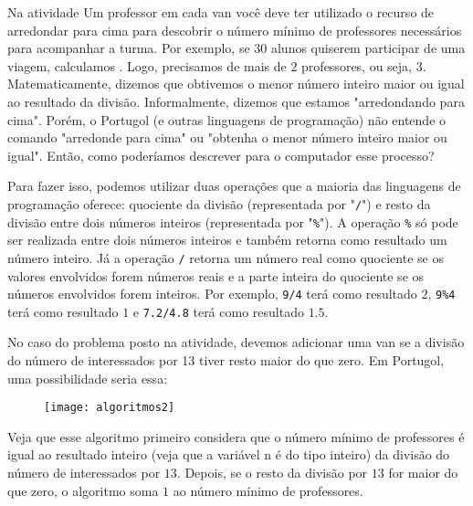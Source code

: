 Na atividade Um professor em cada van você deve ter utilizado o recurso de arredondar para cima para descobrir o número mínimo de professores necessários para acompanhar a turma. Por exemplo, se $30$ alunos quiserem participar de uma viagem, calculamos . Logo, precisamos de mais de $2$ professores, ou seja, $3$. Matematicamente, dizemos que obtivemos o menor número inteiro maior ou igual ao resultado da divisão. Informalmente, dizemos que estamos "arredondando para cima". Porém, o Portugol (e outras linguagens de programação) não entende o comando "arredonde para cima"{} ou "obtenha o menor número inteiro maior ou igual". Então, como poderíamos descrever para o computador esse processo?

Para fazer isso, podemos utilizar duas operações que a maioria das linguagens de programação oferece: quociente da divisão (representada por "\verb|/|") e resto da divisão entre dois números inteiros (representada por "\verb|%|"). A operação \verb|%| só pode ser realizada entre dois números inteiros e também retorna como resultado um número inteiro. Já a operação \verb|/| retorna um número real como quociente se os valores envolvidos forem números reais e a parte inteira do quociente se os números envolvidos forem inteiros. Por exemplo, \verb|9/4| terá como resultado $2$, \verb|9%4| terá como resultado $1$ e \verb|7.2/4.8| terá como resultado $1.5$.

No caso do problema posto na atividade, devemos adicionar uma van se a divisão do número de interessados por 13 tiver resto maior do que zero. Em Portugol, uma possibilidade seria essa:

\begin{figure}[H]
\centering

\texttt{[image: algoritmos2]}
\end{figure}

Veja que esse algoritmo primeiro considera que o número mínimo de professores é igual ao resultado inteiro (veja que a variável n é do tipo inteiro) da divisão do número de interessados por $13$. Depois, se o resto da divisão por $13$ for maior do que zero, o algoritmo soma $1$ ao número mínimo de professores.


